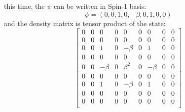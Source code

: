 \documentclass{article}
\begin{document}
this time, the \(\psi\) can be written in Spin-1 basis:
\[\psi=(0,0,1,0,-\beta,0,1,0,0)\]
and the density matrix is tensor product of the state:
\[
    \begin{bmatrix}
     0 & 0 & 0 & 0 & 0 & 0 & 0 & 0 & 0 \\
     0 & 0 & 0 & 0 & 0 & 0 & 0 & 0 & 0 \\
     0 & 0 & 1 & 0 & -\beta  & 0 & 1 & 0 & 0 \\
     0 & 0 & 0 & 0 & 0 & 0 & 0 & 0 & 0 \\
     0 & 0 & -\beta  & 0 & \beta ^2 & 0 & -\beta  & 0 & 0 \\
     0 & 0 & 0 & 0 & 0 & 0 & 0 & 0 & 0 \\
     0 & 0 & 1 & 0 & -\beta  & 0 & 1 & 0 & 0 \\
     0 & 0 & 0 & 0 & 0 & 0 & 0 & 0 & 0 \\
     0 & 0 & 0 & 0 & 0 & 0 & 0 & 0 & 0 \\
    \end{bmatrix}
\]









\end{document}

